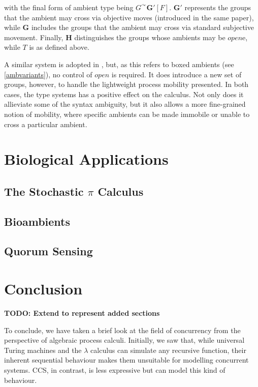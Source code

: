 \noindent with the final form of ambient type being $G^\curvearrowright
\mathbf{G'}[F]$.  $\mathbf{G'}$ represents the groups that the ambient
may cross via objective moves (introduced in the same paper), while
$\mathbf{G}$ includes the groups that the ambient may cross via standard
subjective movement.  Finally, $\mathbf{H}$ distinguishes the groups
whose ambients may be $open$e, while $T$ is as defined above.

A similar system is adopted in \cite{m3}, but, as this refers to boxed
ambients (see \ref{ambvariants}), no control of $open$ is required.  It
does introduce a new set of groups, however, to handle the lightweight
process mobility presented.  In both cases, the type systems has a
positive effect on the calculus.  Not only does it allieviate some of
the syntax ambiguity, but it also allows a more fine-grained notion of
mobility, where specific ambients can be made immobile or unable to
cross a particular ambient.

\section{Biological Applications}
\label{bioapps}

\subsection{The Stochastic $\pi$ Calculus}

\subsection{Bioambients}

\subsection{Quorum Sensing}
\label{quorumsensing}

\section{Conclusion}

\textbf{TODO: Extend to represent added sections}

To conclude, we have taken a brief look at the field of concurrency from
the perspective of algebraic process calculi.  Initially, we saw that,
while universal Turing machines and the $\lambda$ calculus can simulate
any recursive function, their inherent sequential behaviour makes them
unsuitable for modelling concurrent systems.  CCS, in contrast, is less
expressive but can model this kind of behaviour.

